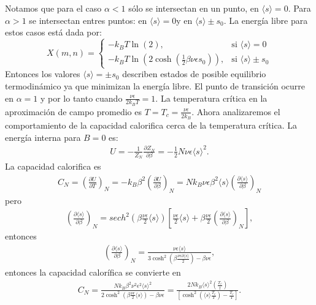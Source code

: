 \documentclass[letterpaper,12pt,oneside]{book}
\begin{document}
Notamos que para el caso $\alpha <1$ s\'olo se intersectan en un punto, en $\langle s \rangle =0$. Para $\alpha > 1$ se intersectan entres puntos: en $\langle s \rangle = 0 $y en $\langle s \rangle \pm s_0$. La energ\'ia libre para estos casos est\'a dada por:
%
\[
  X(m, n) = 
  \begin{cases}
    -k_B T \ln(2), & \text{si } \langle s \rangle = 0 \\
    -k_B T\ln(2\cosh(\frac{1}{2}\beta \nu \epsilon s_0)), & \text{si } \langle s \rangle \pm s_0
  \end{cases}
\]
%
Entonces los valores $\langle s \rangle = \pm s_0$ describen estados de posible equilibrio termodin\'amico ya que minimizan la energ\'ia libre. El punto de transici\'on ocurre en $\alpha = 1$ y por lo tanto cuando $\frac{\nu \epsilon}{2k_B   T} = 1$. 
La temperatura cr\'itica en la aproximaci\'on de campo promedio es  $T= T_c = \frac{\nu \epsilon}{2k_B }$.
Ahora analizaremos el comportamiento de la capacidad calorifica cerca de la temperatura cr\'itica. La energ\'ia interna para $B=0$ es:
%
\begin{eqnarray}
U = -\frac{1}{Z_N} \frac{\partial Z_N}{\partial \beta} = -\frac{1}{2} N \nu \epsilon \langle s \rangle^2.
\end{eqnarray}
%
La capacidad calorifica es 
%
\begin{eqnarray}
C_N = \left( \frac{\partial U}{\partial T}\right)_N = - k_B\beta^2 \left(\frac{\partial U}{\partial \beta} \right)_N = N k_B \nu \epsilon \beta^2 \langle s \rangle \left (\frac{\partial \langle s \rangle}{\partial \beta} \right)_N
\end{eqnarray}
%
pero
%
\begin{eqnarray}
\left (\frac{\partial \langle s \rangle}{\partial \beta} \right)_N = sech^2 \left(\beta \frac{\nu \epsilon}{2} \langle s \rangle \right) \left [\frac{\nu \epsilon}{2} \langle s \rangle + \beta \frac{\nu \epsilon}{2} \left( \frac{\partial \langle s \rangle}{\partial \beta}\right)_N \right],
\end{eqnarray}
%
entonces
%
\begin{eqnarray}
\left (\frac{\partial \langle s \rangle}{\partial \beta} \right)_N = \frac{\nu \epsilon \langle s \rangle}{3 \cosh^2 \left(\beta \frac{\nu \epsilon \partial \langle s \rangle}{2} \right)- \beta \nu \epsilon},
\end{eqnarray}
%
entonces la capacidad calor\'ifica se convierte en
%
\begin{eqnarray}
C_N =\frac{N k_B \beta^2 \nu^2 \epsilon^2 \langle s \rangle^2}{2 \cosh^2\left(\beta \frac{\nu \epsilon}{2}\langle s \rangle \right) -\beta \nu \epsilon} = \frac{2Nk_B\langle s \rangle^2(\frac{T_c}{t})}{[\cosh^2 (\langle s \rangle \frac{T_c}{T})-\frac{T_c}{T}]}.
\end{eqnarray}
\end{document}
